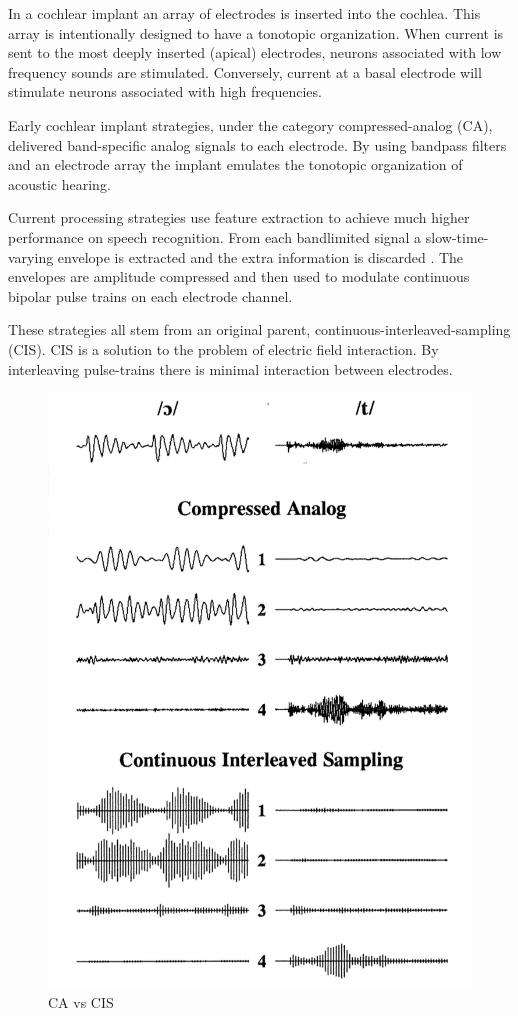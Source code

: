 \documentclass [11pt, proquest,oneside] {ganter_thesis}[2015/03/03]
\begin{document}

In a cochlear implant an array of electrodes is inserted into the cochlea.  This array is intentionally designed to have a tonotopic organization.  When current is sent to the most deeply inserted (apical) electrodes, neurons associated with low frequency sounds are stimulated.  Conversely, current at a basal electrode will stimulate neurons associated with high frequencies.

Early cochlear implant strategies, under the category compressed-analog (CA), delivered band-specific analog signals to each electrode.  By using bandpass filters and an electrode array the implant emulates the tonotopic organization of acoustic hearing.

Current processing strategies use feature extraction to achieve much higher performance on speech recognition.  From each bandlimited signal a slow-time-varying envelope is extracted and the extra information is discarded \cite{vandali2005pitch}.  The envelopes are amplitude compressed and then used to modulate continuous bipolar pulse trains on each electrode channel.

These strategies all stem from an original parent, continuous-interleaved-sampling (CIS).  CIS is a solution to the problem of electric field interaction.  By interleaving pulse-trains there is minimal interaction between electrodes.


\begin{figure}[!ht]
  \centering
    \includegraphics[width=.5\textwidth]{caVScis}   
    \caption{CA vs CIS}
\end{figure}
\end{document}
